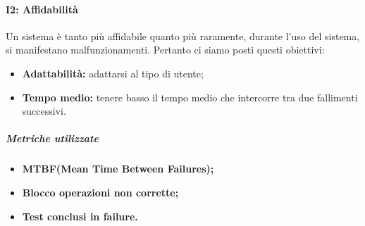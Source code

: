 \paragraph{\textbf{I2: Affidabilità}}
	Un sistema è tanto più affidabile quanto più raramente, durante l'uso del sistema, si manifestano malfunzionamenti. Pertanto ci siamo posti questi obiettivi:
	\begin{itemize}
	\item \textbf{Adattabilità:} adattarsi al tipo di utente;
	\item \textbf{Tempo medio:} tenere basso il tempo medio che intercorre tra due fallimenti successivi.
\end{itemize}
\vspace{0.8cm}
\subparagraph{Metriche utilizzate}
\begin{itemize}
	\item \textbf{MTBF(Mean Time Between Failures);}
	\item \textbf{Blocco operazioni non corrette;}
	\item \textbf{Test conclusi in failure.}
\end{itemize}
\begin{table}[!htpb]
	\centering
	\renewcommand{\arraystretch}{2} 
	\caption{Metriche utilizzate per Affidabilità}
\end{table}
